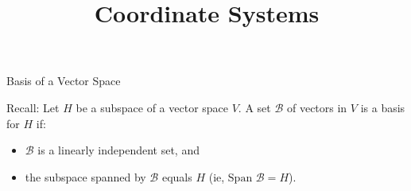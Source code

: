\documentclass[xcolor=dvipsnames,aspectratio=169,t]{beamer}
\title{Coordinate Systems}
\begin{document}
\maketitle

\begin{frame}{Basis of a Vector Space}
  \medskip

  Recall:
  \bbox
  Let $H$ be a subspace of a vector space $V$. A set $\mathcal{B}$ of vectors in $V$ is a \alert{basis for $H$} if:
  \begin{itemize}
  \item $\mathcal{B}$ is a \alert{linearly independent set}, and
  \item the subspace spanned by $\mathcal{B}$ equals $H$ (ie, \alert{$\mbox{Span } \mathcal{B} = H$}).
  \end{itemize}
  \ebox
\end{frame}
\end{document}

